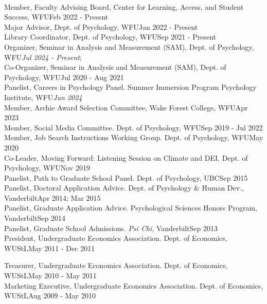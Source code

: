 \smallskip\\
Member, Faculty Advising Board, Center for Learning, Access, and Student Success, WFU\hfill {Feb 2022 - Present}\\
Major Advisor, Dept. of Psychology, WFU\hfill{Jan 2022 - Present}\\
Library Coordinator, Dept. of Psychology, WFU\hfill {Sep 2021 - Present}\\
Organizer, Seminar in Analysis and Measurement (SAM), Dept. of Psychology, WFU\hfill{\textit{Jul 2024 - Present};}\newline 
{}\smallskip\\
Co-Organizer, Seminar in Analysis and Measurement (SAM), Dept. of Psychology, WFU\hfill {Jul 2020 - Aug 2021}\\
Panelist, Careers in Psychology Panel. Summer Immersion Program Psychology Institute, WFU\hfill {\textit{Jun 2024}}\\
Member, Archie Award Selection Committee, Wake Forest College, WFU\hfill{Apr 2023}\\ 
Member, Social Media Committee. Dept. of Psychology, WFU\hfill {Sep 2019 - Jul 2022}\\
Member, Job Search Instructions Working Group. Dept. of Psychology, WFU\hfill{May 2020}\\
Co-Leader, Moving Forward: Listening Session on Climate and DEI, Dept. of Psychology, WFU\hfill {Nov 2019}\\
Panelist, Path to Graduate School Panel. Dept. of Psychology, UBC\hfill {Sep 2015}\\
Panelist, Doctoral Application Advice. Dept. of Psychology \& Human Dev., Vanderbilt\hfill {Apr 2014; Mar 2015}\\
Panelist, Graduate Application Advice. Psychological Sciences Honors Program, Vanderbilt\hfill {Sep 2014}\\
Panelist, Graduate School Admissions. \textit{Psi Chi}, Vanderbilt\hfill{Sep 2013}\\
President, Undergraduate Economics Association. Dept. of Economics, WUStL\hfill{May 2011 - Dec 2011}\\
\begin{minipage}{\linewidth}\vspace{1.1mm} Treasurer, Undergraduate Economics Association. Dept. of Economics, WUStL\hfill{May 2010 - May 2011}\\
Marketing Executive, Undergraduate Economics Association. Dept. of Economics, WUStL\hfill {Aug 2009 - May 2010}\end{minipage}\medskip\\
